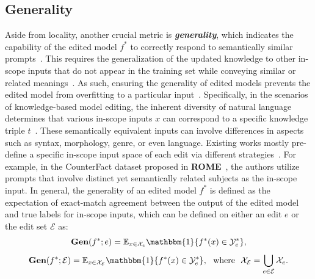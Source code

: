 \documentclass[acmsmall, screen]{acmart}
\begin{document}
\subsection{Generality}
Aside from locality, another crucial metric is \textit{\textbf{generality}}, which indicates the capability of the edited model $f^{*}$ to correctly respond to semantically similar prompts~{\cite{zhu2020modifying,chen2020recall,sharma2024locating,ni2023forgetting,mitchell2022fast}}. This requires the generalization of the updated knowledge to other in-scope inputs that do not appear in the training set while conveying similar or related meanings~{\cite{gupta2024unified, wei2024mlake}}. As such, ensuring the generality of edited models prevents the edited model from overfitting to a particular input~{\cite{zhang2024comprehensive}}.
Specifically, in the scenarios of knowledge-based model editing, the inherent diversity of natural language determines that various in-scope inputs $x$ can correspond to a specific knowledge triple $t$~\cite{wang2023easyedit}. These semantically equivalent inputs can involve differences in aspects such as syntax, morphology, genre, or even language. Existing works mostly pre-define a specific in-scope input space of each edit via different strategies~{\cite{yoon2024bigger,hu2024wilke,wu2024updating,p1,li2024unveiling}}. For example, in the CounterFact dataset proposed in \textbf{ROME}~\cite{meng2022locating}, the authors utilize prompts that involve distinct yet semantically related subjects as the in-scope input. %
In general, the generality of an edited model $f^{*}$ is defined as the expectation of exact-match agreement between the output of the edited model and true labels for in-scope inputs, which can be defined on either an edit $e$ or the edit set $\mathcal{E}$ as:
\begin{equation}
        \textbf{Gen}(f^*; e)=\mathbb{E}_{x \in \mathcal{X}_{{e}}} \mathbbm{1}\{f^*(x)\in \mathcal{Y}_e^*\},
\end{equation}
\begin{equation}
        \textbf{Gen}(f^*; \mathcal{E})=\mathbb{E}_{x \in \mathcal{X}_{\mathcal{E}}} \mathbbm{1}\{f^*(x)\in \mathcal{Y}_e^*\}, \ \ \text{where}\ \ \mathcal{X}_{\mathcal{E}}=\bigcup_{e\in\mathcal{E}}\mathcal{X}_e.
\end{equation}
\end{document}
